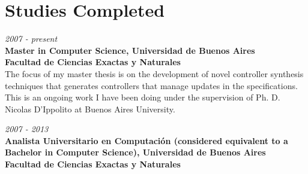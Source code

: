 \section{Studies Completed}

\begin{large}
    \textit{2007 - present}\\
	   \textbf{Master in Computer Science, Universidad de Buenos Aires}\\
      \textbf{Facultad de Ciencias Exactas y Naturales}\\
	  The focus of my master thesis is on the development of novel controller synthesis techniques that generates
      controllers that manage updates in the specifications. This is an ongoing work I have been doing under the
      supervision of Ph. D. Nicolas D'Ippolito at Buenos Aires University.\\
\end{large}

\begin{large}
\noindent    \textit{2007 - 2013}\\
	   \textbf{Analista Universitario en Computación (considered equivalent to a Bachelor in Computer Science), Universidad de Buenos Aires}\\
      \textbf{Facultad de Ciencias Exactas y Naturales}\\
\end{large}

